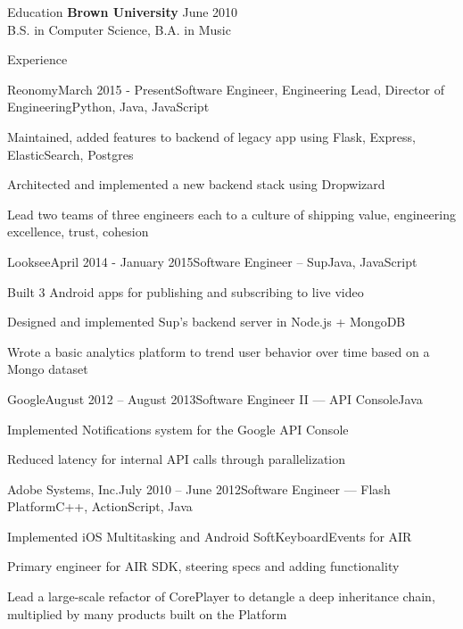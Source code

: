 \documentclass{resume} %
\begin{document}
\begin{rSection}{Education}
{\bf Brown University} \hfill {June 2010} \\ 
B.S. in Computer Science, B.A. in Music
\end{rSection}

\begin{rSection}{Experience}

\begin{rSubsection}{Reonomy}{March 2015 - Present}{Software Engineer, Engineering Lead, Director of Engineering}{Python, Java, JavaScript}
\item Maintained, added features to backend of legacy app using Flask, Express, ElasticSearch, Postgres
\item Architected and implemented a new backend stack using Dropwizard
\item Lead two teams of three engineers each to a culture of shipping value, engineering excellence, trust, cohesion
\end{rSubsection}
\begin{rSubsection}{Looksee}{April 2014 - January 2015}{Software Engineer -- Sup}{Java, JavaScript}
\item Built 3 Android apps for publishing and subscribing to live video
\item Designed and implemented Sup's backend server in Node.js + MongoDB
\item Wrote a basic analytics platform to trend user behavior over time based on a Mongo dataset
\end{rSubsection}
\begin{rSubsection}{Google}{August 2012 -- August 2013}{Software Engineer II --- API Console}{Java}
\item Implemented Notifications system for the Google API Console
\item Reduced latency for internal API calls through parallelization
\end{rSubsection}
\begin{rSubsection}{Adobe Systems, Inc.}{July 2010 -- June 2012}{Software Engineer --- Flash Platform}{C++, ActionScript, Java}
\item Implemented iOS Multitasking and Android SoftKeyboardEvents for AIR
\item Primary engineer for AIR SDK, steering specs and adding functionality
\item Lead a large-scale refactor of CorePlayer to detangle a deep inheritance
    chain, multiplied by many products built on the Platform
\end{rSubsection}
\end{rSection}
\end{document}
